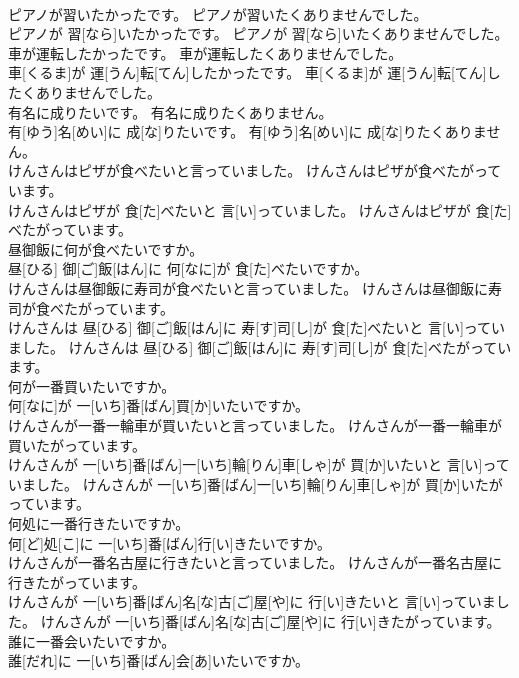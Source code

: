 \documentclass[8pt]{extreport}
\begin{document}
\begin{CJK}{UTF8}{min}
\\	ピアノが習いたかったです。 ピアノが習いたくありませんでした。	
\\	ピアノが 習[なら]いたかったです。 ピアノが 習[なら]いたくありませんでした。
\\	車が運転したかったです。 車が運転したくありませんでした。	
\\	車[くるま]が 運[うん]転[てん]したかったです。 車[くるま]が 運[うん]転[てん]したくありませんでした。
\\	有名に成りたいです。 有名に成りたくありません。	
\\	有[ゆう]名[めい]に 成[な]りたいです。 有[ゆう]名[めい]に 成[な]りたくありません。
\\	けんさんはピザが食べたいと言っていました。 けんさんはピザが食べたがっています。	
\\	けんさんはピザが 食[た]べたいと 言[い]っていました。 けんさんはピザが 食[た]べたがっています。
\\	昼御飯に何が食べたいですか。	
\\	昼[ひる] 御[ご]飯[はん]に 何[なに]が 食[た]べたいですか。
\\	けんさんは昼御飯に寿司が食べたいと言っていました。 けんさんは昼御飯に寿司が食べたがっています。	
\\	けんさんは 昼[ひる] 御[ご]飯[はん]に 寿[す]司[し]が 食[た]べたいと 言[い]っていました。 けんさんは 昼[ひる] 御[ご]飯[はん]に 寿[す]司[し]が 食[た]べたがっています。
\\	何が一番買いたいですか。	
\\	何[なに]が 一[いち]番[ばん]買[か]いたいですか。
\\	けんさんが一番一輪車が買いたいと言っていました。 けんさんが一番一輪車が買いたがっています。	
\\	けんさんが 一[いち]番[ばん]一[いち]輪[りん]車[しゃ]が 買[か]いたいと 言[い]っていました。 けんさんが 一[いち]番[ばん]一[いち]輪[りん]車[しゃ]が 買[か]いたがっています。
\\	何処に一番行きたいですか。	
\\	何[ど]処[こ]に 一[いち]番[ばん]行[い]きたいですか。
\\	けんさんが一番名古屋に行きたいと言っていました。 けんさんが一番名古屋に行きたがっています。	
\\	けんさんが 一[いち]番[ばん]名[な]古[ご]屋[や]に 行[い]きたいと 言[い]っていました。 けんさんが 一[いち]番[ばん]名[な]古[ご]屋[や]に 行[い]きたがっています。
\\	誰に一番会いたいですか。	
\\	誰[だれ]に 一[いち]番[ばん]会[あ]いたいですか。

\end{CJK}
\end{document}
